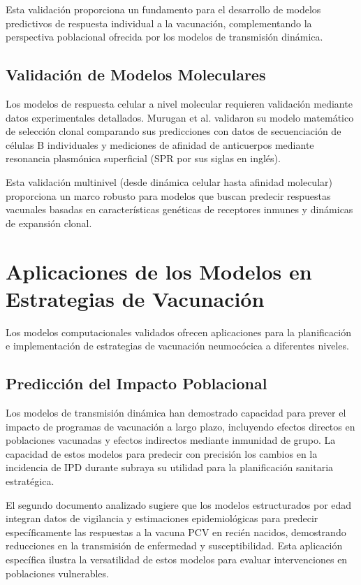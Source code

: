 Esta validación proporciona un fundamento para el desarrollo de modelos predictivos de respuesta individual a la vacunación, complementando la perspectiva poblacional ofrecida por los modelos de transmisión dinámica.

\subsection{Validación de Modelos Moleculares}

Los modelos de respuesta celular a nivel molecular requieren validación mediante datos experimentales detallados. Murugan et al. \cite{Murugan2018} validaron su modelo matemático de selección clonal comparando sus predicciones con datos de secuenciación de células B individuales y mediciones de afinidad de anticuerpos mediante resonancia plasmónica superficial (SPR por sus siglas en inglés).

Esta validación multinivel (desde dinámica celular hasta afinidad molecular) proporciona un marco robusto para modelos que buscan predecir respuestas vacunales basadas en características genéticas de receptores inmunes y dinámicas de expansión clonal.

\section{Aplicaciones de los Modelos en Estrategias de Vacunación}

Los modelos computacionales validados ofrecen aplicaciones para la planificación e implementación de estrategias de vacunación neumocócica a diferentes niveles.

\subsection{Predicción del Impacto Poblacional}

Los modelos de transmisión dinámica han demostrado capacidad para prever el impacto de programas de vacunación a largo plazo, incluyendo efectos directos en poblaciones vacunadas y efectos indirectos mediante inmunidad de grupo. La capacidad de estos modelos para predecir con precisión los cambios en la incidencia de IPD durante subraya su utilidad para la planificación sanitaria estratégica.

El segundo documento analizado sugiere que los modelos estructurados por edad integran datos de vigilancia y estimaciones epidemiológicas para predecir específicamente las respuestas a la vacuna PCV en recién nacidos, demostrando reducciones en la transmisión de enfermedad y susceptibilidad. Esta aplicación específica ilustra la versatilidad de estos modelos para evaluar intervenciones en poblaciones vulnerables.

